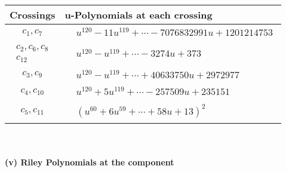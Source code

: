 \documentclass[1p]{elsarticle_modified}
\theoremstyle{definition}
\begin{document}
\begin{tabular}{m{50pt}|m{274pt}}
Crossings & \hspace{64pt}u-Polynomials at each crossing \\
\hline $$\begin{aligned}c_{1},c_{7}\end{aligned}$$&$\begin{aligned}
&u^{120}-11 u^{119}+\cdots-7076832991 u+1201214753
\end{aligned}$\\
\hline $$\begin{aligned}c_{2},c_{6},c_{8}\\c_{12}\end{aligned}$$&$\begin{aligned}
&u^{120}- u^{119}+\cdots-3274 u+373
\end{aligned}$\\
\hline $$\begin{aligned}c_{3},c_{9}\end{aligned}$$&$\begin{aligned}
&u^{120}- u^{119}+\cdots+40633750 u+2972977
\end{aligned}$\\
\hline $$\begin{aligned}c_{4},c_{10}\end{aligned}$$&$\begin{aligned}
&u^{120}+5 u^{119}+\cdots-257509 u+235151
\end{aligned}$\\
\hline $$\begin{aligned}c_{5},c_{11}\end{aligned}$$&$\begin{aligned}
&(u^{60}+6 u^{59}+\cdots+58 u+13)^{2}
\end{aligned}$\\
\hline
\end{tabular}\\~\\
\newpage\renewcommand{\arraystretch}{1}
\flushleft \textbf{(v) Riley Polynomials at the component}\newline \\
\end{document}
